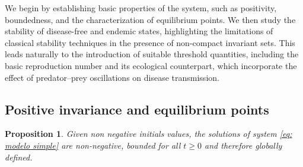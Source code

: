 \documentclass{amsart}
\newtheorem{prop}[thm]{Proposition}
\theoremstyle{definition}
\theoremstyle{remark}
\numberwithin{equation}{section}
\begin{document}
We begin by establishing basic properties of the system, such as positivity, boundedness, and the characterization of equilibrium points. We then study the stability of disease-free and endemic states, highlighting the limitations of classical stability techniques in the presence of non-compact invariant sets. This leads naturally to the introduction of suitable threshold quantities, including the basic reproduction number and its ecological counterpart, which incorporate the effect of predator–prey oscillations on disease transmission.

\subsection{Positive invariance and equilibrium points} %
\begin{prop} \label{pr: soluciones globales}
		Given non negative initials values, the solutions of system \eqref{eq: modelo simple} are non-negative, bounded for  all $t\geq 0$ and therefore globally defined. 
\end{prop}
\end{document}
